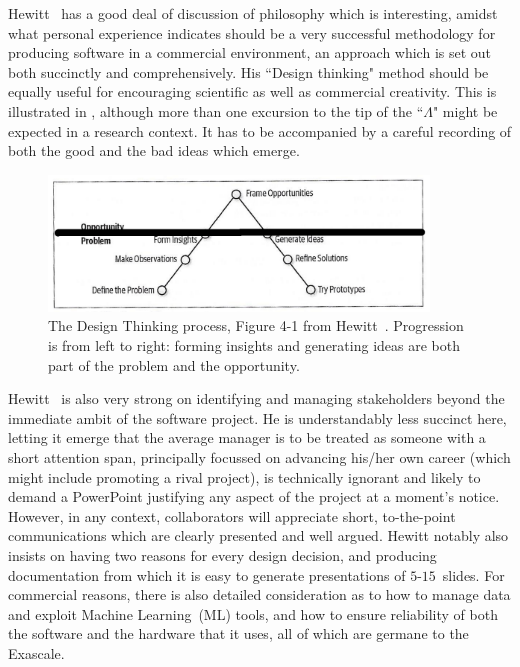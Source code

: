 Hewitt~\cite{hewittexc} 
has a good deal of discussion of philosophy which is interesting, amidst
what personal experience indicates should be a very successful methodology
for producing software in a commercial environment, an approach
which is set out both succinctly and comprehensively. His ``Design thinking"
method should be equally useful for encouraging scientific as well as commercial
creativity. This is illustrated in , although 
more than one excursion to the tip of the ``$\Lambda$"
might be expected in a research context. It has to be accompanied by a careful
recording of both the good and the bad ideas which emerge.
\begin{figure}
\centerline{\includegraphics[width=0.9\textwidth]{../png/hewitt_flowl}}
\caption{The Design Thinking process, Figure 4-1 from Hewitt~.
Progression is from left to right: forming insights and generating ideas are both
part of the problem and the opportunity.
\label{fig:hewitt_flowl}}
\end{figure}
Hewitt~\cite{hewittexc} is also very strong on identifying and managing stakeholders beyond the
immediate ambit of the software project. He is understandably less succinct here, letting
it emerge that the average manager is to be treated as someone with a short attention span, principally
focussed on advancing his/her own career (which might include promoting a rival project),
is technically ignorant and likely to demand a PowerPoint justifying any aspect of the project at a moment's notice.
However, in any context, collaborators will appreciate short, to-the-point communications which are clearly presented and well
argued. Hewitt notably also insists on having two reasons for every design decision,
and producing documentation from which it is easy to generate presentations of $5$-$15$~slides.
For commercial reasons, there is also detailed consideration as to how to manage data and
exploit Machine Learning~(ML) tools, and how to 
ensure reliability of both the software and the hardware that it uses, all of which
are germane to the Exascale.

